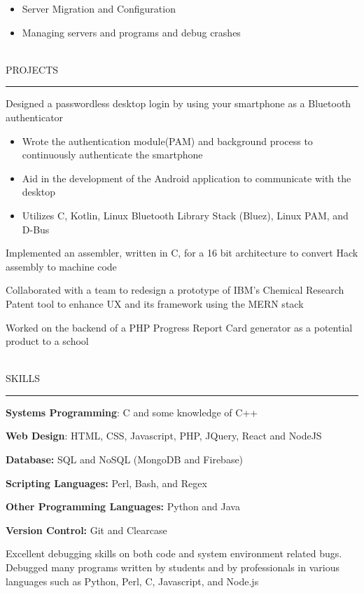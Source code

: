 \documentclass[10pt]{report}
\begin{document}
\begin{itemize}[leftmargin=*]
\itemsep0em 
    \item Server Migration and Configuration
    \item Managing servers and programs and debug crashes
\end{itemize}
\hfill\\
\large{PROJECTS} \vspace{4pt}
\hrule
\begin{itemize}[leftmargin=*]
\vspace{4pt}
\itemsep2pt 
\normalsize{
    \item Designed a passwordless desktop login by using your smartphone as a Bluetooth authenticator
    \begin{itemize}
    \vspace{4pt}
    \itemsep0em 
    \item Wrote the authentication module(PAM) and background process to continuously authenticate the smartphone
    \item Aid in the development of the Android application to communicate with the desktop
    \item \small{Utilizes C, Kotlin, Linux Bluetooth Library Stack (Bluez), Linux PAM, and D-Bus}
    \end{itemize}
    \item Implemented an assembler, written in C, for a 16 bit architecture to convert Hack assembly to machine code
    \item Collaborated with a team to redesign a prototype of IBM's Chemical Research Patent tool to enhance UX and its framework using the MERN stack
    \item Worked on the backend of a PHP Progress Report Card generator as a potential product to a school
}
\end{itemize}
\hfill\\
\large{SKILLS} \vspace{4pt}
\hrule
\begin{itemize}[leftmargin=*]
\vspace{4pt}
\itemsep2pt 
\normalsize{
    \item \textbf{Systems Programming}: C and some knowledge of C++
    \item \textbf{Web Design}: HTML, CSS, Javascript, PHP, JQuery, React and NodeJS
    \item \textbf{Database:} SQL and NoSQL (MongoDB and Firebase)
    \item \textbf{Scripting Languages:} Perl, Bash, and Regex
    \item \textbf{Other Programming Languages:} Python and Java
    \item \textbf{Version Control:} Git and Clearcase
    \item Excellent debugging skills on both code and system environment related bugs. Debugged many programs written by students and by professionals in various languages such as Python, Perl, C, Javascript, and Node.js
}
\end{itemize}
\end{document}

